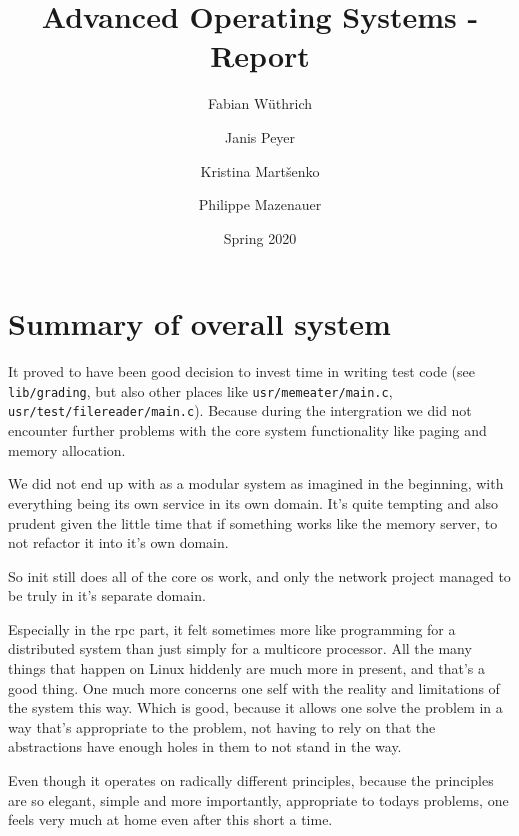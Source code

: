 \documentclass[11pt,a4paper]{report}
\begin{document}
\title{Advanced Operating Systems - Report}
\author{
Fabian W{\" u}thrich
\and
Janis Peyer 
\and
Kristina Mart{\v s}enko
\and
Philippe Mazenauer
}
\date{Spring 2020}

\maketitle

\tableofcontents

\listoffigures

\listoftables

\clearpage























\chapter{Summary of overall system}

It proved to have been good decision to invest time in writing test code
(see \verb|lib/grading|, but also other places like \verb|usr/memeater/main.c|,
\verb|usr/test/filereader/main.c|).
Because during the intergration we did not encounter further problems with the
core system functionality like paging and memory allocation.

We did not end up with as a modular system as imagined in the beginning, with
everything being its own service in its own domain.
It's quite tempting and also prudent given the little time that if something
works like the memory server, to not refactor it into it's own domain.

So init still does all of the core os work, and only the network project managed
to be truly in it's separate domain.

Especially in the rpc part, it felt sometimes more like programming for a
distributed system than just simply for a multicore processor.
All the many things that happen on Linux hiddenly are much more in present, and
that's a good thing.
One much more concerns one self with the reality and limitations of the system
this way.
Which is good, because it allows one solve the problem in a way that's
appropriate to the problem, not having to rely on that the abstractions have
enough holes in them to not stand in the way.

Even though it operates on radically different principles, because the
principles are so elegant, simple and more importantly, appropriate to todays
problems, one feels very much at home even after this short a time.

\appendix



\printbibliography
\end{document}
